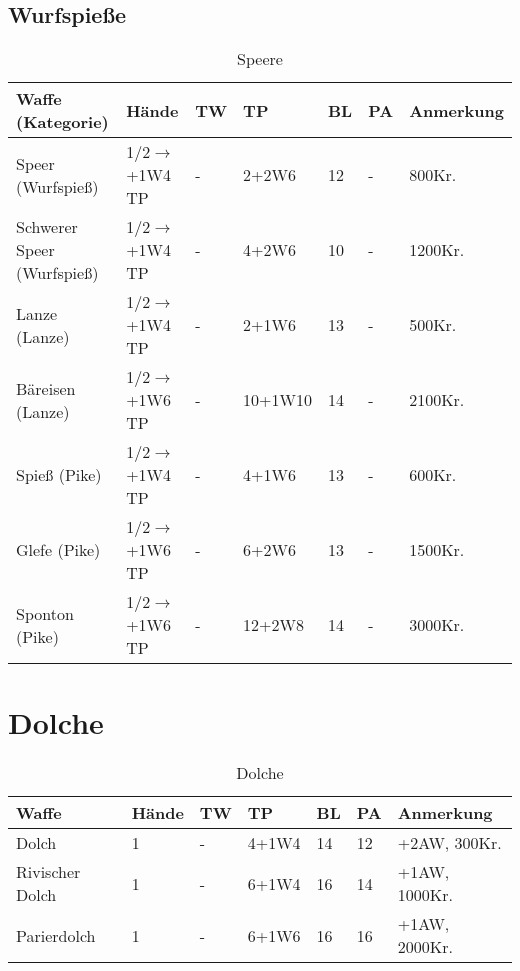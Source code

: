\subsection{Wurfspieße}
\begin{table}[H]
\begin{center}
\begin{tabular}{|l|l|l|l|l|l|p{2.5cm}|}
\hline
\textbf{Waffe (Kategorie)} & \textbf{Hände} & \textbf{TW} & \textbf{TP} & \textbf{BL} & \textbf{PA} & \textbf{Anmerkung} \\ \hline

Speer (Wurfspieß) & 1/2$\rightarrow$+1W4 TP & - & 2+2W6 & 12 & - & 800Kr. \\ \hline

Schwerer Speer (Wurfspieß) & 1/2$\rightarrow$+1W4 TP & - & 4+2W6 & 10 & - & 1200Kr. \\ \hline

Lanze (Lanze) & 1/2$\rightarrow$+1W4 TP & - & 2+1W6 & 13 & - & 500Kr. \\ \hline

Bäreisen (Lanze) & 1/2$\rightarrow$+1W6 TP & - & 10+1W10 & 14 & - & 2100Kr. \\ \hline

Spieß (Pike) & 1/2$\rightarrow$+1W4 TP & - & 4+1W6 & 13 & - & 600Kr. \\ \hline

Glefe (Pike) & 1/2$\rightarrow$+1W6 TP & - & 6+2W6 & 13 & - & 1500Kr. \\ \hline

Sponton (Pike) & 1/2$\rightarrow$+1W6 TP & - & 12+2W8 & 14 & - & 3000Kr. \\ \hline

\end{tabular}
\end{center}
\caption{Speere}
\label{tab:Speere}
\end{table}

\section{Dolche}
\begin{table}[H]
\begin{center}
\begin{tabular}{|l|l|l|l|l|l|p{2.5cm}|}
\hline
\textbf{Waffe} & \textbf{Hände} & \textbf{TW} & \textbf{TP} & \textbf{BL} & \textbf{PA} & \textbf{Anmerkung} \\

\hline
Dolch & 1 & - & 4+1W4 & 14 & 12 & +2AW, 300Kr. \\

\hline
Rivischer Dolch & 1 & - & 6+1W4 & 16 & 14 & +1AW, 1000Kr. \\ \hline

\hline
Parierdolch & 1 & - & 6+1W6 & 16 & 16 & +1AW, 2000Kr. \\

\hline
\end{tabular}
\end{center}
\caption{Dolche}
\label{tab:Dolche}
\end{table}


